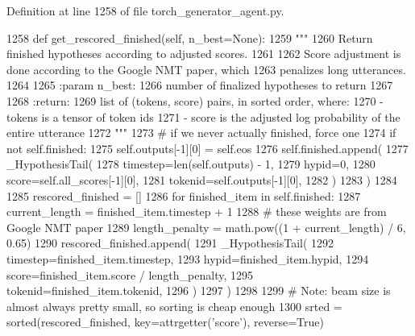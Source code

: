 Definition at line 1258 of file torch\+\_\+generator\+\_\+agent.\+py.


\begin{DoxyCode}
1258     \textcolor{keyword}{def }get\_rescored\_finished(self, n\_best=None):
1259         \textcolor{stringliteral}{"""}
1260 \textcolor{stringliteral}{        Return finished hypotheses according to adjusted scores.}
1261 \textcolor{stringliteral}{}
1262 \textcolor{stringliteral}{        Score adjustment is done according to the Google NMT paper, which}
1263 \textcolor{stringliteral}{        penalizes long utterances.}
1264 \textcolor{stringliteral}{}
1265 \textcolor{stringliteral}{        :param n\_best:}
1266 \textcolor{stringliteral}{            number of finalized hypotheses to return}
1267 \textcolor{stringliteral}{}
1268 \textcolor{stringliteral}{        :return:}
1269 \textcolor{stringliteral}{            list of (tokens, score) pairs, in sorted order, where:}
1270 \textcolor{stringliteral}{              - tokens is a tensor of token ids}
1271 \textcolor{stringliteral}{              - score is the adjusted log probability of the entire utterance}
1272 \textcolor{stringliteral}{        """}
1273         \textcolor{comment}{# if we never actually finished, force one}
1274         \textcolor{keywordflow}{if} \textcolor{keywordflow}{not} self.finished:
1275             self.outputs[-1][0] = self.eos
1276             self.finished.append(
1277                 \_HypothesisTail(
1278                     timestep=len(self.outputs) - 1,
1279                     hypid=0,
1280                     score=self.all\_scores[-1][0],
1281                     tokenid=self.outputs[-1][0],
1282                 )
1283             )
1284 
1285         rescored\_finished = []
1286         \textcolor{keywordflow}{for} finished\_item \textcolor{keywordflow}{in} self.finished:
1287             current\_length = finished\_item.timestep + 1
1288             \textcolor{comment}{# these weights are from Google NMT paper}
1289             length\_penalty = math.pow((1 + current\_length) / 6, 0.65)
1290             rescored\_finished.append(
1291                 \_HypothesisTail(
1292                     timestep=finished\_item.timestep,
1293                     hypid=finished\_item.hypid,
1294                     score=finished\_item.score / length\_penalty,
1295                     tokenid=finished\_item.tokenid,
1296                 )
1297             )
1298 
1299         \textcolor{comment}{# Note: beam size is almost always pretty small, so sorting is cheap enough}
1300         srted = sorted(rescored\_finished, key=attrgetter(\textcolor{stringliteral}{'score'}), reverse=\textcolor{keyword}{True})

\end{DoxyCode}
